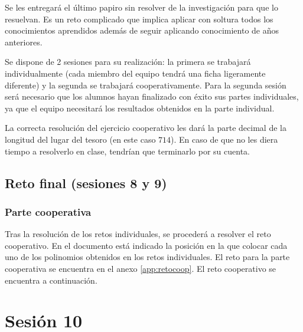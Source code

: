 Se les entregará el último papiro sin resolver de la investigación para que lo resuelvan.
%
Es un reto complicado que implica aplicar con soltura todos los conocimientos aprendidos además de seguir aplicando conocimiento de años anteriores.


Se dispone de 2 sesiones para su realización: la primera se trabajará individualmente (cada miembro del equipo tendrá una ficha ligeramente diferente) y la segunda se trabajará cooperativamente.
%
Para la segunda sesión será necesario que los alumnos hayan finalizado con éxito sus partes individuales, ya que el equipo necesitará los resultados obtenidos en la parte individual.

La correcta resolución del ejercicio cooperativo les dará la parte decimal de la longitud del lugar del tesoro (en este caso $714$).
%
En caso de que no les diera tiempo a resolverlo en clase, tendrían que terminarlo por su cuenta.


\subsection{Reto final (sesiones 8 y 9)}
\label{ses8:indiv}




\subsubsection{Parte cooperativa}
\label{ses8:coop}

Tras la resolución de los retos individuales, se procederá a resolver el reto cooperativo.
%
En el documento está indicado la posición en la que colocar cada uno de los polinomios obtenidos en los retos individuales.
%
\ifinapp
	El reto para la parte cooperativa se encuentra en el anexo \ref{app:retocoop}.
\else 
	El reto cooperativo se encuentra a continuación.
	
\fi







\section{Sesión 10}\label{app:ses_comp:10}



